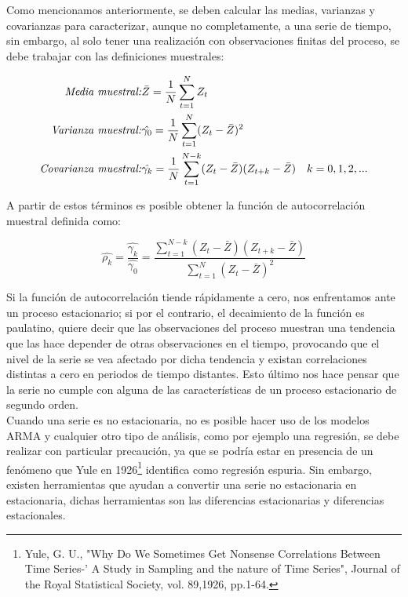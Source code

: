 Como mencionamos anteriormente, se deben calcular las medias, varianzas y covarianzas para caracterizar, aunque no completamente, a una serie de tiempo, sin embargo, al solo tener una realización con observaciones finitas del proceso, se debe trabajar con las definiciones muestrales:\newline


\begin{eqnarray}
        \mbox{\emph{Media muestral:}} & \bar{Z} =\frac{1}{N} \sum_{t=1}^{N}{Z_t} &  \nonumber \\ 
        \mbox{\emph{Varianza muestral:}}  & \hat{\gamma_0}=\frac{1}{N} \sum_{t=1}^{N}(Z_t- \bar{Z} )^2 & \\ 
        \mbox{\emph{Covarianza muestral:}} & \hat{\gamma_k}=\frac{1}{N} \sum_{t=1}^{N-k}(Z_t-\bar{Z})(Z_{t+k}-\bar{Z})  & k=0,1,2,...  \nonumber
\end{eqnarray} 

A partir de estos términos es posible obtener la función de autocorrelación muestral definida como:

\begin{equation}
\hat{\rho_k}= \frac{\hat{\gamma_k}}{\hat{\gamma_0}}=\frac{\sum_{t=1}^{N-k}(Z_t-\bar{Z})(Z_{t+k}-\bar{Z})}{\sum_{t=1}^{N}(Z_t- \bar{Z} )^2}
\end{equation}




Si la función de autocorrelación tiende rápidamente a cero, nos enfrentamos ante un proceso estacionario; si por el contrario, el decaimiento de la función es paulatino, quiere decir que las observaciones del proceso muestran una tendencia que las hace depender de  otras observaciones en el tiempo, provocando que el nivel de la serie se vea afectado por dicha tendencia y existan correlaciones distintas a cero en periodos de tiempo distantes. Esto último nos hace pensar que la serie no cumple con alguna de las características de un proceso estacionario de segundo orden. \\


Cuando una serie es no estacionaria, no es posible hacer uso de los modelos ARMA y cualquier otro tipo de análisis, como por ejemplo una regresión, se debe realizar con particular precaución, ya que se podría estar en presencia de un fenómeno que Yule en 1926\footnote{Yule, G. U., "Why Do We Sometimes Get Nonsense Correlations Between Time Series-' A Study in Sampling and the nature of Time Series", Journal of the Royal Statistical Society, vol. 89,1926, pp.1-64.} identifica como regresión espuria. Sin embargo, existen herramientas que ayudan a convertir una serie no estacionaria en estacionaria, dichas herramientas son las diferencias estacionarias y diferencias estacionales.\\

